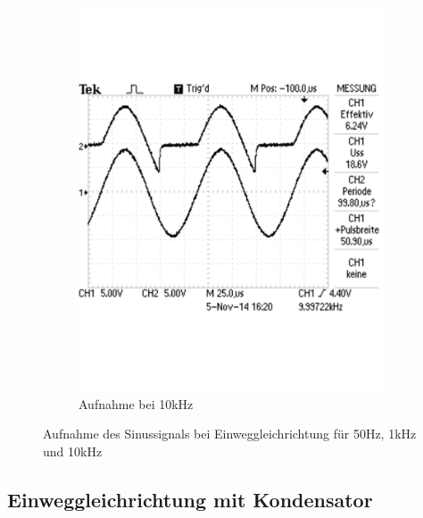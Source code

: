 \documentclass[12pt,a4paper]{article}
\begin{document}
\begin{figure}[H]
\begin{subfigure}[b]{0.28\textwidth}
        		\includegraphics[width=\textwidth, scale = 0.4]{2_1_3.pdf}
                \caption[Aufnahme bei 10kHz]{Aufnahme bei 10kHz}
  				\label{fig:2_1_3}
        \end{subfigure}
        \caption{Aufnahme des Sinussignals bei Einweggleichrichtung für 50Hz, 1kHz und 10kHz}
        \label{fig:2_1_rech_vergleich}
\end{figure}

\subsection{Einweggleichrichtung mit Kondensator}
\end{document}
